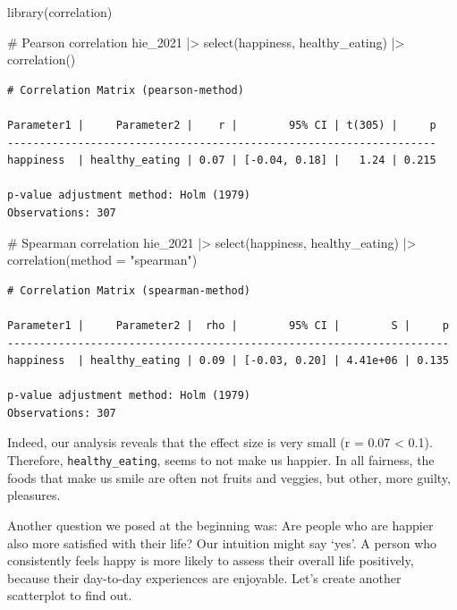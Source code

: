 \documentclass[
  letterpaper,
]{krantz}
\makeatletter
\newenvironment{Shaded}{\begin{snugshade}}{\end{snugshade}}
\newcommand{\AttributeTok}[1]{\textcolor[rgb]{0.40,0.45,0.13}{#1}}
\newcommand{\CommentTok}[1]{\textcolor[rgb]{0.37,0.37,0.37}{#1}}
\newcommand{\FunctionTok}[1]{\textcolor[rgb]{0.28,0.35,0.67}{#1}}
\newcommand{\NormalTok}[1]{\textcolor[rgb]{0.00,0.23,0.31}{#1}}
\newcommand{\SpecialCharTok}[1]{\textcolor[rgb]{0.37,0.37,0.37}{#1}}
\newcommand{\StringTok}[1]{\textcolor[rgb]{0.13,0.47,0.30}{#1}}
\newenvironment{kframe}{%
\medskip{}
\setlength{\fboxsep}{.8em}
 \def\at@end@of@kframe{}%
 \ifinner\ifhmode%
  \def\at@end@of@kframe{\end{minipage}}%
  \begin{minipage}{\columnwidth}%
 \fi\fi%
 \def\FrameCommand##1{\hskip\@totalleftmargin \hskip-\fboxsep
 \colorbox{shadecolor}{##1}\hskip-\fboxsep
     \hskip-\linewidth \hskip-\@totalleftmargin \hskip\columnwidth}%
 \MakeFramed {\advance\hsize-\width
   \@totalleftmargin\z@ \linewidth\hsize
   \@setminipage}}%
 {\par\unskip\endMakeFramed%
 \at@end@of@kframe}
\renewenvironment{Shaded}{\begin{kframe}}{\end{kframe}}
\makeatother
\begin{document}
\begin{Shaded}
\begin{Highlighting}[]
\FunctionTok{library}\NormalTok{(correlation)}

\CommentTok{\# Pearson correlation}
\NormalTok{hie\_2021 }\SpecialCharTok{|\textgreater{}}
  \FunctionTok{select}\NormalTok{(happiness, healthy\_eating) }\SpecialCharTok{|\textgreater{}}
  \FunctionTok{correlation}\NormalTok{()}
\end{Highlighting}
\end{Shaded}

\begin{verbatim}
# Correlation Matrix (pearson-method)

Parameter1 |     Parameter2 |    r |        95% CI | t(305) |     p
-------------------------------------------------------------------
happiness  | healthy_eating | 0.07 | [-0.04, 0.18] |   1.24 | 0.215

p-value adjustment method: Holm (1979)
Observations: 307
\end{verbatim}

\begin{Shaded}
\begin{Highlighting}[]
\CommentTok{\# Spearman correlation}
\NormalTok{hie\_2021 }\SpecialCharTok{|\textgreater{}}
  \FunctionTok{select}\NormalTok{(happiness, healthy\_eating) }\SpecialCharTok{|\textgreater{}}
  \FunctionTok{correlation}\NormalTok{(}\AttributeTok{method =} \StringTok{"spearman"}\NormalTok{)}
\end{Highlighting}
\end{Shaded}

\begin{verbatim}
# Correlation Matrix (spearman-method)

Parameter1 |     Parameter2 |  rho |        95% CI |        S |     p
---------------------------------------------------------------------
happiness  | healthy_eating | 0.09 | [-0.03, 0.20] | 4.41e+06 | 0.135

p-value adjustment method: Holm (1979)
Observations: 307
\end{verbatim}

Indeed, our analysis reveals that the effect size is very small (r =
0.07 \textless{} 0.1). Therefore, \texttt{healthy\_eating}, seems to not
make us happier. In all fairness, the foods that make us smile are often
not fruits and veggies, but other, more guilty, pleasures.

Another question we posed at the beginning was: Are people who are
happier also more satisfied with their life? Our intuition might say
`yes'. A person who consistently feels happy is more likely to assess
their overall life positively, because their day-to-day experiences are
enjoyable. Let's create another scatterplot to find out.
\end{document}
